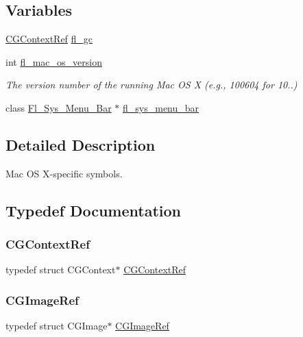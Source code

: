 \subsection*{Variables}
\begin{DoxyCompactItemize}
\item 
\hyperlink{mac_8_h_aa24159a5753580ec784c2fd390213c7f}{C\+G\+Context\+Ref} \hyperlink{mac_8_h_a34fa7427998af327143f335a71a66733}{fl\+\_\+gc}
\item 
int \hyperlink{group__group__macosx_ga2c7db6b2ea9a6ae37a26bea810d2056c}{fl\+\_\+mac\+\_\+os\+\_\+version}
\begin{DoxyCompactList}\small\item\em The version number of the running Mac OS X (e.\+g., 100604 for 10..) \end{DoxyCompactList}\item 
class \hyperlink{_fl___sys___menu___bar_8_h_a615bb5494aaeeb4298839e7a7cbcd09d}{Fl\+\_\+\+Sys\+\_\+\+Menu\+\_\+\+Bar} $\ast$ \hyperlink{group__group__macosx_gae169f554b5d3d2726f5e208df78e091b}{fl\+\_\+sys\+\_\+menu\+\_\+bar}
\end{DoxyCompactItemize}


\subsection{Detailed Description}
Mac OS X-\/specific symbols. 

\subsection{Typedef Documentation}
\mbox{\label{mac_8_h_aa24159a5753580ec784c2fd390213c7f}} 
\subsubsection{\texorpdfstring{C\+G\+Context\+Ref}{CGContextRef}}
{\footnotesize\ttfamily typedef struct C\+G\+Context$\ast$ \hyperlink{mac_8_h_aa24159a5753580ec784c2fd390213c7f}{C\+G\+Context\+Ref}}

\mbox{\label{mac_8_h_a75461eac74c23c49c936eb8811388b88}} 
\subsubsection{\texorpdfstring{C\+G\+Image\+Ref}{CGImageRef}}
{\footnotesize\ttfamily typedef struct C\+G\+Image$\ast$ \hyperlink{mac_8_h_a75461eac74c23c49c936eb8811388b88}{C\+G\+Image\+Ref}}

